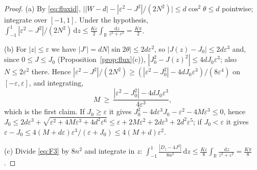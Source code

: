 \documentclass[11pt,a4paper]{article}
\theoremstyle{plain}
\theoremstyle{definition}
\theoremstyle{remark}
\newcommand{\R}{\mathbb{R}}
\newcommand{\dd}{\,\mathrm{d}}
\begin{document}
\begin{proof}
(a) By \eqref{eq:fluxid}, $\big||W-d|-|\varepsilon^2-J^2|/(2N^2)\big|\le d\cos^2\theta\le d$ pointwise; integrate over $[-1,1]$. Under the hypothesis, $\int_{-1}^{1}|\varepsilon^2-J^2|/(2N^2)\dd z\le\tfrac{K\varepsilon}{2}\int_\R\frac{\dd z}{z^2+\varepsilon^2}=\tfrac{K\pi}{2}$.

(b) For $|z|\le\varepsilon$ we have $|J'|=dN|\sin2\theta|\le2d\varepsilon^2$, so $|J(z)-J_0|\le2d\varepsilon^3$ and, since $0\le J\le J_0$ (Proposition~\ref{prop:flux}(c)), $|J_0^2-J(z)^2|\le4dJ_0\varepsilon^3$; also $N\le2\varepsilon^2$ there. Hence $|\varepsilon^2-J^2|/(2N^2)\ge(|\varepsilon^2-J_0^2|-4dJ_0\varepsilon^3)/(8\varepsilon^4)$ on $[-\varepsilon,\varepsilon]$, and integrating,
\[
M\ \ge\ \frac{|\varepsilon^2-J_0^2|-4dJ_0\varepsilon^3}{4\varepsilon^3},
\]
which is the first claim. If $J_0\ge\varepsilon$ it gives $J_0^2-4d\varepsilon^3J_0-\varepsilon^2-4M\varepsilon^3\le0$, hence $J_0\le2d\varepsilon^3+\sqrt{\varepsilon^2+4M\varepsilon^3+4d^2\varepsilon^6}\le\varepsilon+2M\varepsilon^2+2d\varepsilon^3+2d^2\varepsilon^5$; if $J_0<\varepsilon$ it gives $\varepsilon-J_0\le4(M+d\varepsilon)\varepsilon^3/(\varepsilon+J_0)\le4(M+d)\varepsilon^2$.

(c) Divide \eqref{eq:F3} by $8n^2$ and integrate in $z$: $\int_{-1}^{1}\frac{|D_z-4J^2|}{8n^2}\dd z\le\frac{K\varepsilon}{8}\int_\R\frac{\dd z}{z^2+\varepsilon^2}=\frac{K\pi}{8}$.
\end{proof}
\end{document}
